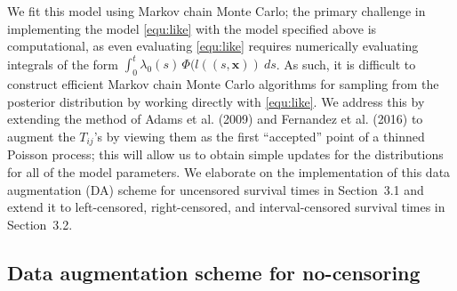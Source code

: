 \documentclass[11pt]{article}
\begin{document}
 We fit this model using Markov chain Monte Carlo; the primary challenge in implementing the model \eqref{equ:like} with the model specified above is computational, as even evaluating \eqref{equ:like} requires numerically evaluating integrals of the form $\int_0^t \lambda_0(s) \, \Phi(l((s, \mathbf x)) \ ds$. As such, it is difficult to construct efficient Markov chain Monte Carlo algorithms for sampling from the posterior distribution by working directly with \eqref{equ:like}. We address this by extending the method of Adams et al. (2009) and Fernandez et al. (2016) to augment the $T_{ij}$'s by viewing them as the first ``accepted'' point of a thinned Poisson process; this will allow us to obtain simple updates for the distributions for all of the model parameters. We elaborate on the implementation of this data augmentation (DA) scheme for uncensored survival times in Section~3.1 and extend it to left-censored, right-censored, and interval-censored survival times in Section~3.2.

\subsection{Data augmentation scheme for no-censoring}
\end{document}
